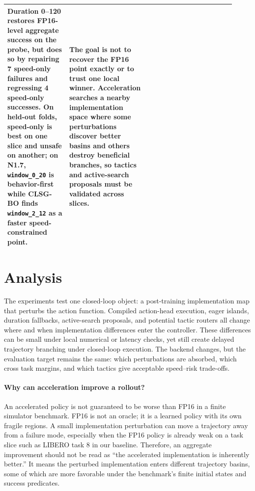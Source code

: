 \documentclass[10pt]{article}
\begin{document}
\begin{table}[H]
\begin{tabular}{p{0.25\linewidth}p{0.33\linewidth}p{0.34\linewidth}}
Duration 0--120 restores FP16-level aggregate success on the probe, but does so by repairing 7 speed-only failures and regressing 4 speed-only successes. On held-out folds, speed-only is best on one slice and unsafe on another; on N1.7, \texttt{window\_0\_20} is behavior-first while CLSG-BO finds \texttt{window\_2\_12} as a faster speed-constrained point. &
The goal is not to recover the FP16 point exactly or to trust one local winner. Acceleration searches a nearby implementation space where some perturbations discover better basins and others destroy beneficial branches, so tactics and active-search proposals must be validated across slices. \\
\bottomrule
\end{tabular}
\end{table}

\section{Analysis}

The experiments test one closed-loop object: a post-training implementation map that perturbs the action function. Compiled action-head execution, eager islands, duration fallbacks, active-search proposals, and potential tactic routers all change where and when implementation differences enter the controller. These differences can be small under local numerical or latency checks, yet still create delayed trajectory branching under closed-loop execution. The backend changes, but the evaluation target remains the same: which perturbations are absorbed, which cross task margins, and which tactics give acceptable speed--risk trade-offs.

\paragraph{Why can acceleration improve a rollout?}
An accelerated policy is not guaranteed to be worse than FP16 in a finite simulator benchmark. FP16 is not an oracle; it is a learned policy with its own fragile regions. A small implementation perturbation can move a trajectory away from a failure mode, especially when the FP16 policy is already weak on a task slice such as LIBERO task 8 in our baseline. Therefore, an aggregate improvement should not be read as ``the accelerated implementation is inherently better.'' It means the perturbed implementation enters different trajectory basins, some of which are more favorable under the benchmark's finite initial states and success predicates.
\end{document}
